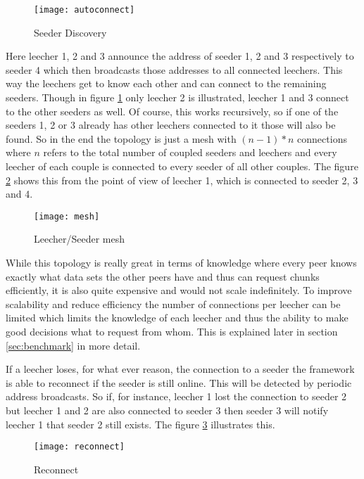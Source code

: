 \begin{figure}[H]
\centering
\texttt{[image: autoconnect]}
\caption{Seeder Discovery}
\label{fig:autoconnect}
\end{figure}

Here leecher 1, 2 and 3 announce the address of seeder 1, 2 and 3 respectively to seeder 4 which then broadcasts those addresses to all connected leechers. This way the leechers get to know each other and can connect to the remaining seeders. Though in figure \ref{fig:autoconnect} only leecher 2 is illustrated, leecher 1 and 3 connect to the other seeders as well. Of course, this works recursively, so if one of the seeders 1, 2 or 3 already has other leechers connected to it those will also be found. So in the end the topology is just a mesh with $(n-1)*n$ connections where $n$ refers to the total number of coupled seeders and leechers and every leecher of each couple is connected to every seeder of all other couples. The figure \ref{fig:mesh} shows this from the point of view of leecher 1, which is connected to seeder 2, 3 and 4.

\begin{figure}[H]
\centering
\texttt{[image: mesh]}
\caption{Leecher/Seeder mesh}
\label{fig:mesh}
\end{figure}

While this topology is really great in terms of knowledge where every peer knows exactly what data sets the other peers have and thus can request chunks efficiently, it is also quite expensive and would not scale indefinitely. To improve scalability and reduce efficiency the number of connections per leecher can be limited which limits the knowledge of each leecher and thus the ability to make good decisions what to request from whom. This is explained later in section \ref{sec:benchmark} in more detail.

If a leecher loses, for what ever reason, the connection to a seeder the framework is able to reconnect if the seeder is still online. This will be detected by periodic address broadcasts. So if, for instance, leecher 1 lost the connection to seeder 2 but leecher 1 and 2 are also connected to seeder 3 then seeder 3 will notify leecher 1 that seeder 2 still exists. The figure \ref{fig:reconnect} illustrates this.

\begin{figure}[H]
\centering
\texttt{[image: reconnect]}
\caption{Reconnect}
\label{fig:reconnect}
\end{figure}


